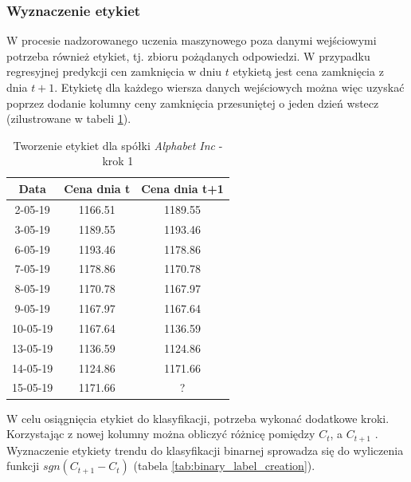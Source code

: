 \documentclass[a4paper, twoside, 11pt, openright]{article}
\begin{document}
\subsubsection{Wyznaczenie etykiet}

W procesie nadzorowanego uczenia maszynowego poza danymi wejściowymi potrzeba również etykiet, tj. zbioru pożądanych odpowiedzi. W przypadku regresyjnej predykcji cen zamknięcia w dniu $t$ etykietą jest cena zamknięcia z dnia $t+1$. Etykietę dla każdego wiersza danych wejściowych można więc uzyskać poprzez dodanie kolumny ceny zamknięcia przesuniętej o jeden dzień wstecz (zilustrowane w tabeli \ref{tab:regression_label_creation}). 

 \begin{table}[H]
    \centering
    \begin{tabular}{|c|c|c|}
    \hline
        \textbf{Data}  & \textbf{Cena dnia t} & \textbf{Cena dnia t+1}\\ \hline
            2-05-19 & 1166.51 & 1189.55 \\ \hline
            3-05-19 & 1189.55 & 1193.46 \\ \hline 
            6-05-19 & 1193.46 & 1178.86 \\ \hline 
            7-05-19 & 1178.86 & 1170.78 \\ \hline 
            8-05-19 & 1170.78 & 1167.97 \\ \hline 
            9-05-19 & 1167.97 & 1167.64 \\ \hline 
            10-05-19 & 1167.64 & 1136.59 \\ \hline 
            13-05-19 & 1136.59 & 1124.86 \\ \hline 
            14-05-19 & 1124.86 & 1171.66 \\ \hline 
            15-05-19 & 1171.66 & ? \\ \hline 
    \end{tabular}
    \caption{Tworzenie etykiet dla spółki \textit{Alphabet Inc} - krok 1}
    \label{tab:regression_label_creation}
\end{table} 

W celu osiągnięcia etykiet do klasyfikacji, potrzeba wykonać dodatkowe kroki. Korzystając z nowej kolumny można obliczyć różnicę pomiędzy $C_t$, a $C_{t+1}$ . Wyznaczenie etykiety trendu do klasyfikacji binarnej sprowadza się do wyliczenia funkcji $sgn(C_{t+1}-C_{t})$ (tabela \ref{tab:binary_label_creation}). 
\end{document}
